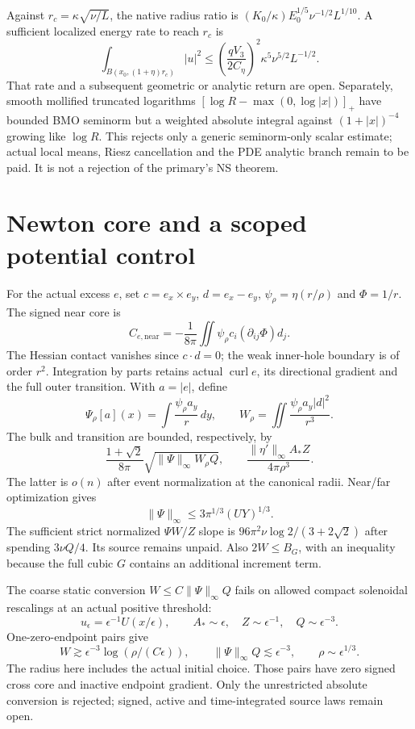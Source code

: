 \documentclass[11pt]{article}
\begin{document}
Against $r_c=\kappa\sqrt{\nu/L}$, the native radius ratio is
$(K_0/\kappa)E_0^{1/5}\nu^{-1/2}L^{1/10}$. A sufficient localized
energy rate to reach $r_c$ is
\[
 \int_{B(x_0,(1+\eta)r_c)}|u|^2
 \le\left(\frac{qV_3}{2C_\eta}\right)^2
 \kappa^5\nu^{5/2}L^{-1/2}.
\]
That rate and a subsequent geometric or analytic return are open.
Separately, smooth mollified truncated logarithms
$[\log R-\max(0,\log|x|)]_+$ have bounded BMO seminorm but a
weighted absolute integral against $(1+|x|)^{-4}$ growing like
$\log R$. This rejects only a generic seminorm-only scalar estimate;
actual local means, Riesz cancellation and the PDE analytic branch
remain to be paid. It is not a rejection of the primary's NS theorem.

\section{Newton core and a scoped potential control}
For the actual excess $e$, set $c=e_x\times e_y$, $d=e_x-e_y$,
$\psi_\rho=\eta(r/\rho)$ and $\Phi=1/r$. The signed near core is
\[
 C_{e,\mathrm{near}}=-\frac1{8\pi}\iint
 \psi_\rho c_i(\partial_{ij}\Phi)d_j.
\]
The Hessian contact vanishes since $c\cdot d=0$; the weak inner-hole
boundary is of order $r^2$. Integration by parts retains actual
$\operatorname{curl}e$, its directional gradient and the full outer
transition. With $a=|e|$, define
\[
 \Psi_\rho[a](x)=\int\frac{\psi_\rho a_y}{r}\,dy,\qquad
 W_\rho=\iint\frac{\psi_\rho a_y|d|^2}{r^3}.
\]
The bulk and transition are bounded, respectively, by
\[
 \frac{1+\sqrt2}{8\pi}\sqrt{\|\Psi\|_\infty W_\rho Q},
 \qquad \frac{\|\eta'\|_\infty A_*Z}{4\pi\rho^3}.
\]
The latter is $o(n)$ after event normalization at the canonical radii.
Near/far optimization gives
\[
 \|\Psi\|_\infty\le3\pi^{1/3}(UY)^{1/3}.
\]
The sufficient strict normalized $\Psi W/Z$ slope is
$96\pi^2\nu\log2/(3+2\sqrt2)$ after spending $3\nu Q/4$.
Its source remains unpaid. Also $2W\le B_G$, with an inequality
because the full cubic $G$ contains an additional increment term.

The coarse static conversion $W\le C\|\Psi\|_\infty Q$ fails
on allowed compact solenoidal rescalings at an actual positive threshold:
\[
 u_\epsilon=\epsilon^{-1}U(x/\epsilon),\qquad
 A_*\sim\epsilon,\quad Z\sim\epsilon^{-1},\quad Q\sim\epsilon^{-3}.
\]
One-zero-endpoint pairs give
\[
 W\gtrsim\epsilon^{-3}\log(\rho/(C\epsilon)),\qquad
 \|\Psi\|_\infty Q\lesssim\epsilon^{-3},\qquad
 \rho\sim\epsilon^{1/3}.
\]
The radius here includes the actual initial choice.
Those pairs have zero signed cross core and inactive endpoint gradient.
Only the unrestricted absolute conversion is rejected; signed, active
and time-integrated source laws remain open.
\end{document}
